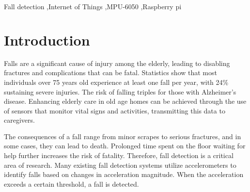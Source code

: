 \documentclass[final,5p,times,twocolumn,authoryear]{elsarticle}
\begin{document}
\begin{frontmatter}


\begin{keyword}
Fall detection  \sep Internet of Things \sep MPU-6050 \sep Raspberry pi



\end{keyword}


\end{frontmatter}




\section{Introduction}
\label{introduction}

Falls are a significant cause of injury among the elderly, leading to disabling fractures and complications that can be fatal. Statistics show that most individuals over 75 years old experience at least one fall per year, with 24\% sustaining severe injuries. The risk of falling triples for those with Alzheimer’s disease. Enhancing elderly care in old age homes can be achieved through the use of sensors that monitor vital signs and activities, transmitting this data to caregivers. 

The consequences of a fall range from minor scrapes to serious fractures, and in some cases, they can lead to death. Prolonged time spent on the floor waiting for help further increases the risk of fatality. Therefore, fall detection is a critical area of research. Many existing fall detection systems utilize accelerometers to identify falls based on changes in acceleration magnitude. When the acceleration exceeds a certain threshold, a fall is detected. 
\end{document}
